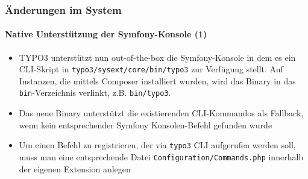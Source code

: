 \begin{frame}[fragile]
	\frametitle{Änderungen im System}
	\framesubtitle{Native Unterstützung der Symfony-Konsole (1)}

	\lstset{basicstyle=\tiny\ttfamily}

	\begin{itemize}

		\item TYPO3 unterstützt nun out-of-the-box die Symfony-Konsole in dem es ein CLI-Skript in \texttt{typo3/sysext/core/bin/typo3} zur Verfügung stellt. Auf Instanzen, die mittels Composer installiert wurden, wird das Binary in das \texttt{bin}-Verzeichnis verlinkt, z.B. \texttt{bin/typo3}.

		\item Das neue Binary unterstützt die existierenden CLI-Kommandos als Fallback, wenn kein entsprechender Symfony Konsolen-Befehl gefunden wurde

		\item Um einen Befehl zu registrieren, der via \texttt{typo3} CLI aufgerufen werden soll, muss man eine entsprechende Datei \texttt{Configuration/Commands.php} innerhalb der eigenen Extension anlegen

	\end{itemize}

\end{frame}

